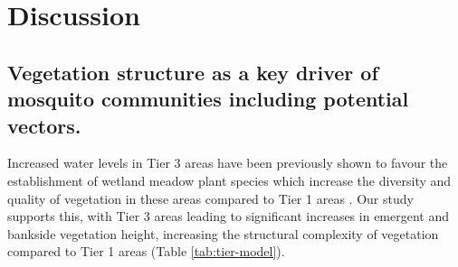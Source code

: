 \documentclass[lineno,sn-basic]{sn-jnl}%
\begin{document}
\section{Discussion}

\subsection{Vegetation structure as a key driver of mosquito communities including potential vectors.}

Increased water levels in Tier 3 areas have been previously shown to favour the establishment of wetland meadow plant species which increase the diversity and quality of vegetation in these areas compared to Tier 1 areas \citep{acremanTradeoffEcosystemServices2011}. Our study supports this, with Tier 3 areas leading to significant increases in emergent and bankside vegetation height, increasing the structural complexity of vegetation compared to Tier 1 areas (Table \ref{tab:tier-model}). 
\end{document}
